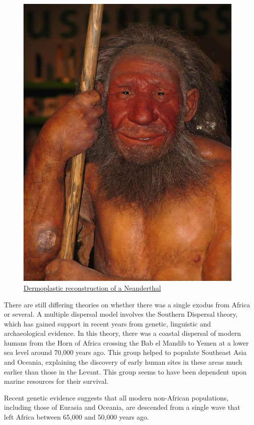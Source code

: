 \begin{figure}

{\centering \includegraphics[width=0.7\linewidth]{./figures/animals/Neandertaler_reconst} 

}

\caption{\href{https://commons.wikimedia.org/wiki/File:Neandertaler_reconst.jpg}{Dermoplastic reconstruction of a Neanderthal}}\label{fig:neanderthal}
\end{figure}

There are still differing theories on whether there was a single exodus from Africa or several. A multiple dispersal model involves the Southern Dispersal theory, which has gained support in recent years from genetic, linguistic and archaeological evidence. In this theory, there was a coastal dispersal of modern humans from the Horn of Africa crossing the Bab el Mandib to Yemen at a lower sea level around 70,000 years ago. This group helped to populate Southeast Asia and Oceania, explaining the discovery of early human sites in these areas much earlier than those in the Levant. This group seems to have been dependent upon marine resources for their survival.

Recent genetic evidence suggests that all modern non-African populations, including those of Eurasia and Oceania, are descended from a single wave that left Africa between 65,000 and 50,000 years ago.

